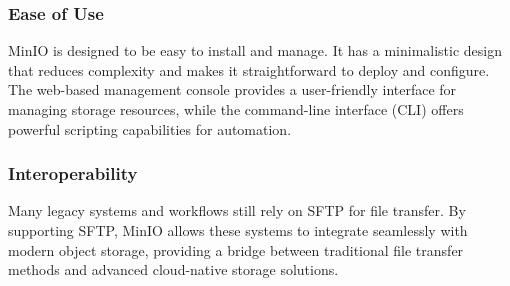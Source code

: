 \subsubsection{Ease of Use}
MinIO is designed to be easy to install and manage. It has a minimalistic design
that reduces complexity and makes it straightforward to deploy and configure.
The web-based management console provides a user-friendly interface for managing
storage resources, while the command-line interface (CLI) offers powerful
scripting capabilities for automation.

\subsubsection{Interoperability}
Many legacy systems and workflows still rely on SFTP for file transfer. By
supporting SFTP, MinIO allows these systems to integrate seamlessly with modern
object storage, providing a bridge between traditional file transfer methods and
advanced cloud-native storage solutions.